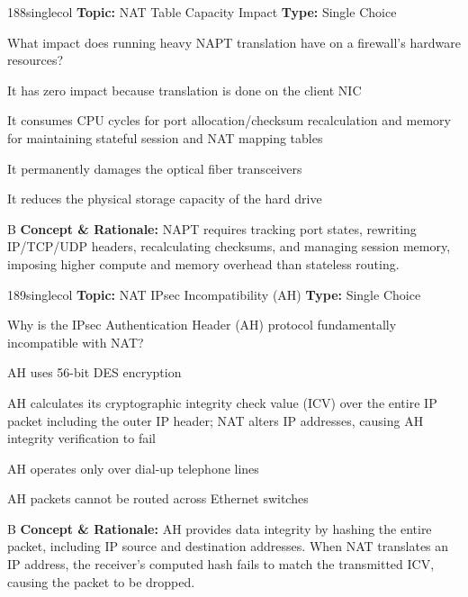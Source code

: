 \begin{qcard}{188}{singlecol}
\textcolor{darkslate!75}{\small\textbf{Topic:} NAT Table Capacity Impact \hfill \textbf{Type:} Single Choice}\vspace{0.4em}\par
What impact does running heavy NAPT translation have on a firewall's hardware resources?
\begin{qoptions}
\item It has zero impact because translation is done on the client NIC
\item It consumes CPU cycles for port allocation/checksum recalculation and memory for maintaining stateful session and NAT mapping tables
\item It permanently damages the optical fiber transceivers
\item It reduces the physical storage capacity of the hard drive
\end{qoptions}
\end{qcard}
\nopagebreak
\begin{explainbox}{B}
\textbf{Concept \& Rationale:} NAPT requires tracking port states, rewriting IP/TCP/UDP headers, recalculating checksums, and managing session memory, imposing higher compute and memory overhead than stateless routing.
\end{explainbox}

\begin{qcard}{189}{singlecol}
\textcolor{darkslate!75}{\small\textbf{Topic:} NAT IPsec Incompatibility (AH) \hfill \textbf{Type:} Single Choice}\vspace{0.4em}\par
Why is the IPsec Authentication Header (AH) protocol fundamentally incompatible with NAT?
\begin{qoptions}
\item AH uses 56-bit DES encryption
\item AH calculates its cryptographic integrity check value (ICV) over the entire IP packet including the outer IP header; NAT alters IP addresses, causing AH integrity verification to fail
\item AH operates only over dial-up telephone lines
\item AH packets cannot be routed across Ethernet switches
\end{qoptions}
\end{qcard}
\nopagebreak
\begin{explainbox}{B}
\textbf{Concept \& Rationale:} AH provides data integrity by hashing the entire packet, including IP source and destination addresses. When NAT translates an IP address, the receiver's computed hash fails to match the transmitted ICV, causing the packet to be dropped.
\end{explainbox}

